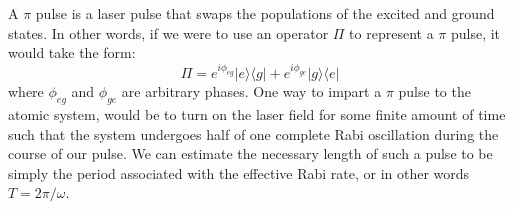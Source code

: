 A $\pi$ pulse is a laser pulse that swaps the populations of the excited and ground states. In other words, if we were to use an operator $\Pi$ to represent a $\pi$ pulse, it would take the form:
\begin{equation}
\Pi=e^{i\phi_{eg}}|e\rangle\langle g|+e^{i\phi_{ge}}|g\rangle\langle e|
\end{equation}
where $\phi_{eg}$ and $\phi_{ge}$ are arbitrary phases. 
One way to impart a $\pi$ pulse to the atomic system, would be to turn on the laser field for some finite amount of time such that the system undergoes half of one complete Rabi oscillation during the course of our pulse. We can estimate the necessary length of such a pulse to be simply the period associated with the effective Rabi rate, or in other words $T = 2\pi/\omega$.

%
%
%
%
%
%
%
%
%
%
%
